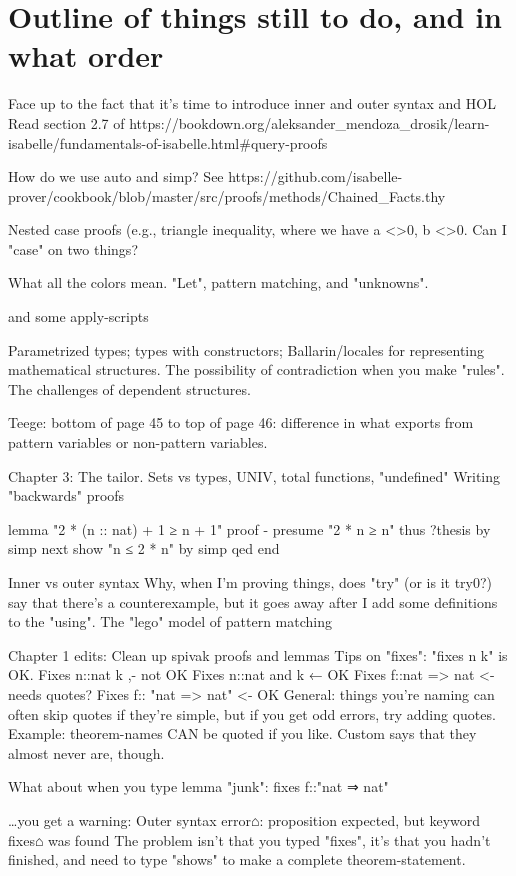 
\chapter{Outline of things still to do, and in what order}
Face up to the fact that it's time to introduce inner and outer syntax and HOL
Read section 2.7 of https://bookdown.org/aleksander_mendoza_drosik/learn-isabelle/fundamentals-of-isabelle.html#query-proofs

How do we use auto and simp? See https://github.com/isabelle-prover/cookbook/blob/master/src/proofs/methods/Chained_Facts.thy

Nested case proofs (e.g., triangle inequality, where we have a <>0, b <>0. Can I "case" on two things? 

What all the colors mean. "Let", pattern matching, and "unknowns". 

and some apply-scripts


Parametrized types; types with constructors; Ballarin/locales for representing mathematical structures. The possibility of contradiction when you make "rules". The challenges of dependent structures.

Teege: bottom of page 45 to top of page 46: difference in what exports from pattern variables or non-pattern variables.



Chapter 3: The tailor. Sets vs types, UNIV, total functions, "undefined"
Writing "backwards" proofs

lemma "2 * (n :: nat) + 1 ≥ n + 1"
proof -
  presume "2 * n ≥ n"
   thus ?thesis
     by simp
next
   show "n ≤ 2 * n"
     by simp
qed
end



Inner vs outer syntax
Why, when I'm proving things, does "try" (or is it try0?) say that there's a counterexample, but it goes away after I add some definitions to the "using".
The "lego" model of 
pattern matching
 
Chapter 1 edits:
Clean up spivak proofs and lemmas
Tips on "fixes": "fixes n k" is OK. 
Fixes n::nat k ,- not OK
Fixes n::nat and k ← OK
Fixes f::nat => nat <- needs quotes? 
Fixes f:: "nat => nat" <- OK
General: things you're naming can often skip quotes if they're simple, but if you get odd errors, try adding quotes. Example: theorem-names CAN be quoted if you like. Custom says that they almost never are, though. 

What about when you type
lemma "junk":
  fixes f::"nat ⇒ nat"

…you get a warning: Outer syntax error⌂: proposition expected,
but keyword fixes⌂ was found
 The problem isn't that you typed "fixes", it's that you hadn't finished, and need to type "shows" to make a complete theorem-statement. 

